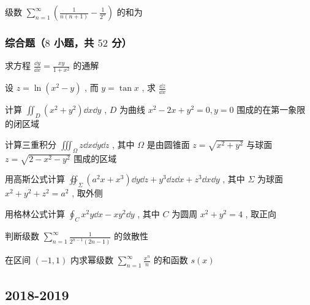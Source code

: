 \begin{ti}
	级数 $\sum_{n=1}^{\infty}\left(\frac{1}{n(n+1)}-\frac{1}{2^{n}}\right)$ 的和为 \hua{}
\end{ti}

\subsubsection{综合题（$8$ 小题，共 $52$ 分）}
\begin{ti}[$6$ 分]
	求方程 $\frac{\dd{y}}{\dd{x}}=\frac{x y}{1+x^{2}}$ 的通解
\end{ti}

\begin{ti}[$6$ 分]
	设 $z=\ln \left(x^{2}-y\right)$ , 而 $y=\tan x$ , 求 $\frac{\dd{z}}{\dd{x}}$
\end{ti}

\begin{ti}[$6$ 分]
	计算 $\iint_{D}\left(x^{2}+y^{2}\right) \dd{x} \dd{y}$ , $D$ 为曲线 $x^{2}-2 x+y^{2}=0, y=0$ 围成的在第一象限的闭区域
\end{ti}

\begin{ti}[$6$ 分]
	计算三重积分 $\iiint_{\Omega} z \dd{x} \dd{y} \dd{z}$ , 其中 $\Omega$ 是由圆锥面 $z=\sqrt{x^{2}+y^{2}}$ 与球面 $z=\sqrt{2-x^{2}-y^{2}}$ 围成的区域
\end{ti}

\begin{ti}[$8$ 分]
	用高斯公式计算 $\oiint_{\Sigma}\left(a^{2} x+x^{3}\right) \dd{y} \dd{z}+y^{3} \dd{z} \dd{x}+z^{3} \dd{x} \dd{y}$ , 其中 $\Sigma$ 为球面 $x^{2}+y^{2}+z^{2}=a^{2}$ , 取外侧
\end{ti}

\begin{ti}[$8$ 分]
	用格林公式计算 $\oint_{C} x^{2} y \dd{x}-x y^{2} \dd{y}$ , 其中 $C$ 为圆周 $x^2+y^2=4$ , 取正向
\end{ti}

\begin{ti}[$6$ 分]
	判断级数 $\sum_{n=1}^{\infty} \frac{1}{2^{n-1}(2 n-1)}$ 的敛散性
\end{ti}

\begin{ti}[$6$ 分]
	在区间 $(-1,1)$ 内求幂级数 $\sum_{n=1}^{\infty} \frac{x^{n}}{n}$ 的和函数 $s(x)$
\end{ti}

\subsection{2018-2019}
